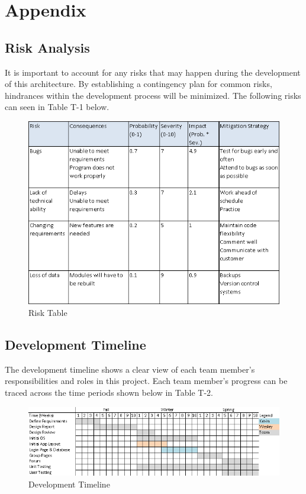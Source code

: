 \chapter*{Appendix}

\section{Risk Analysis}
It is important to account for any risks that may happen during the development of this architecture. By establishing a contingency plan for common risks, hindrances within the development process will be minimized. The following risks can seen in Table T-1 below.

\begin{figure}[h]
	\includegraphics[width=\linewidth]{images/risk_analysis.png}
	\caption{Risk Table}
	\label{fig:risk table}
	\centering
\end{figure}

\clearpage
\newpage

\section{Development Timeline}
The development timeline shows a clear view of each team member’s responsibilities and roles in this project. Each team member’s progress can be traced across the time periods shown below in Table T-2.

\begin{figure}[h]
	\includegraphics[width=\linewidth]{images/timeline.png}
	\caption{Development Timeline}
	\label{fig:timeline}
	\centering
\end{figure}